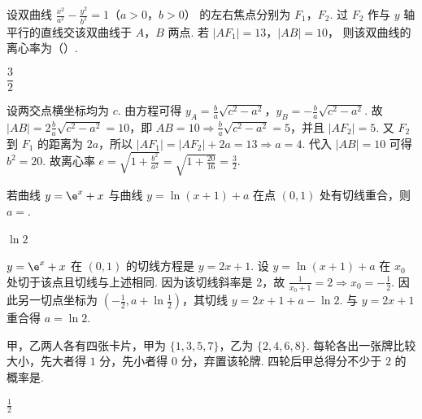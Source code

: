 \begin{problem}
设双曲线
\(\frac{x^2}{a^2}-\frac{y^2}{b^2}=1\)（\(a>0\)，\(b>0\)）
的左右焦点分别为 \(F_1\)，\(F_2\). 过 \(F_2\) 作与 \(y\) 轴平行的直线交该双曲线于 \(A\)，\(B\) 两点. 若
\(|AF_1|=13\)，\(|AB|=10\)，
则该双曲线的离心率为（\quad）.

\end{problem}

\begin{answer}
\(\dfrac{3}{2}\)
\end{answer}

\begin{solution}
设两交点横坐标均为 \(c\). 由方程可得
\(y_A=\frac{b}{a}\sqrt{c^2-a^2}\)，\(y_B=-\frac{b}{a}\sqrt{c^2-a^2}\).
故 \(|AB|=2\frac{b}{a}\sqrt{c^2-a^2}=10\)，即 \(AB=10\Rightarrow \frac{b}{a}\sqrt{c^2-a^2}=5\)，并且
\(|AF_2|=5\).
又 \(F_2\) 到 \(F_1\) 的距离为 \(2a\)，所以
\(|AF_1|=|AF_2|+2a=13\Rightarrow a=4\).
代入 \(|AB|=10\) 可得 \(b^2=20\). 故离心率
\(e=\sqrt{1+\frac{b^2}{a^2}}=\sqrt{1+\frac{20}{16}}=\frac32\).
\end{solution}

\begin{problem}
若曲线 \(y=\e^x+x\) 与曲线 \(y=\ln(x+1)+a\) 在点 \((0,1)\) 处有切线重合，则 \(a=\)\fillinblank{}.
\end{problem}

\begin{answer}
\(\ln2\)
\end{answer}

\begin{solution}
\(y=\e^x+x\) 在 \((0,1)\) 的切线方程是
\(y=2x+1\).
设 \(y=\ln(x+1)+a\) 在 \(x_0\) 处切于该点且切线与上述相同. 因为该切线斜率是 2，故
\(\frac{1}{x_0+1}=2\Rightarrow x_0=-\frac12\).
因此另一切点坐标为 \(\left(-\frac12,a+\ln\frac12\right)\)，其切线
\(y=2x+1+a-\ln2\).
与 \(y=2x+1\) 重合得 \(a=\ln2\).
\end{solution}

\begin{problem}
甲，乙两人各有四张卡片，甲为 \(\{1,3,5,7\}\)，乙为 \(\{2,4,6,8\}\). 每轮各出一张牌比较大小，先大者得 \(1\) 分，先小者得 \(0\) 分，弃置该轮牌. 四轮后甲总得分不少于 \(2\) 的概率是\fillinblank{}.
\end{problem}

\begin{answer}
\(\frac12\)
\end{answer}

